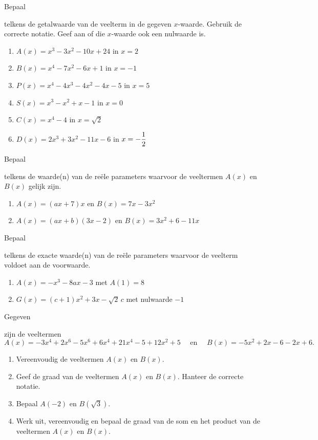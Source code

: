 \documentclass{ximera}
\begin{document}
\begin{Oefening}\setcounter{enumi}{8}
\hypertarget{oef1.8}{Bepaal} telkens de getalwaarde van de veelterm in de gegeven $x$-waarde. Gebruik de correcte notatie. Geef aan of die $x$-waarde ook een nulwaarde is. 
\begin{enumerate}%
\item
$A(x) = x^3-3x^2-10x+24$ \quad in $x = 2$
\item
$B(x) = x^4-7x^2-6x+1$ \quad in $x = -1$
\item
$P(x) = x^4-4x^3-4x^2-4x-5$ \quad in $x = 5$
\item
$S(x) = x^3-x^2+x-1$ \quad in $x = 0$
\item
$C(x) = x^4-4$ \quad in $x = \sqrt{2}$
\item
$D(x) = 2x^3 + 3x^2 - 11x - 6$ \quad in $\displaystyle x = -\frac{1}{2}$
\end{enumerate}
\end{Oefening}

\begin{Oefening}\setcounter{enumi}{9} 
\hypertarget{oef1.9}{Bepaal} telkens de waarde(n) van de re\"ele parameters waarvoor de veeltermen $A(x)$ en $B(x)$ gelijk zijn.
\begin{enumerate}%
\item
$A(x) = (ax+7)x$ en $B(x) = 7x-3x^2$ %
\item
$A(x) = (ax+b)(3x-2)$ en $B(x) = 3x^2+6-11x$ %
\end{enumerate}
\end{Oefening}

\begin{Oefening}\setcounter{enumi}{10} 
\hypertarget{oef1.10}{Bepaal} telkens de exacte waarde(n) van de re\"ele parameters waarvoor de veelterm voldoet aan de voorwaarde. 
\begin{enumerate}%
\item
$A(x) = -x^3-8ax-3$  %
met $A(1) = 8$ 
\item
$G(x) = (c+1)x^2+3x-\sqrt{2}\,c$ %
met nulwaarde $-1$
\end{enumerate}
\end{Oefening}

\begin{Oefening}\setcounter{enumi}{11} 
\hypertarget{oef1.11}{Gegeven} zijn de veeltermen 
\[
A(x) = -3x^4+2x^6-5x^6+6x^4+21x^4-5+12x^2+5 \quad \text{ en } \quad B(x) = -5x^2+2x-6-2x+6.
\]
\begin{enumerate}%
\item
Vereenvoudig de veeltermen $A(x)$ en $B(x)$.
\item
Geef de graad van de veeltermen $A(x)$ en $B(x)$. Hanteer de correcte notatie.
\item
Bepaal $A(-2)$ en $B(\sqrt{3})$. 
\item
Werk uit, vereenvoudig en bepaal de graad van de som en het product van de veeltermen $A(x)$ en $B(x)$. 
\end{enumerate}
\end{Oefening}
\end{document}
